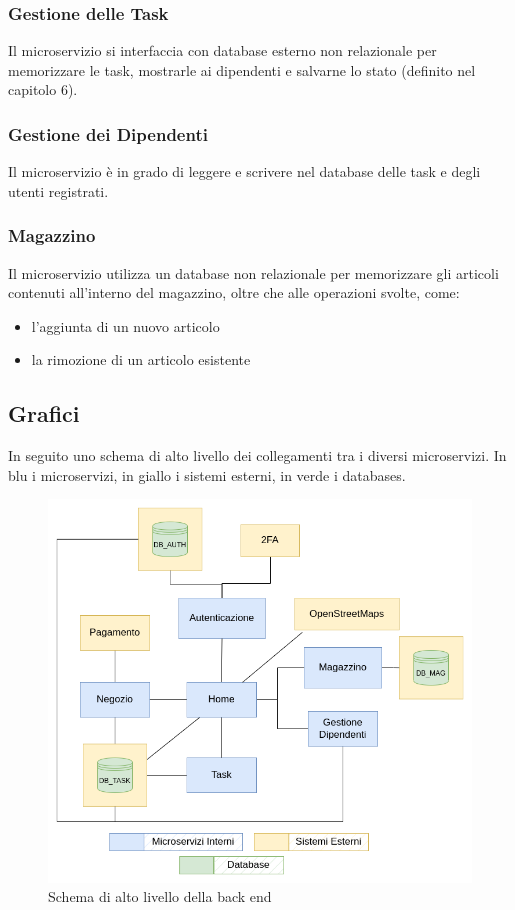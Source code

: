 \documentclass{report}
\begin{document}
\subsubsection*{Gestione delle Task}
Il microservizio si interfaccia con database esterno non relazionale per memorizzare le task, mostrarle ai dipendenti e salvarne lo stato (definito nel capitolo 6).

\subsubsection*{Gestione dei Dipendenti}
Il microservizio è in grado di leggere e scrivere nel database delle task e degli utenti registrati.

\subsubsection*{Magazzino}
Il microservizio utilizza un database non relazionale per memorizzare gli articoli contenuti all’interno del magazzino, oltre che alle operazioni svolte, come:

\begin{itemize}
	\item l’aggiunta di un nuovo articolo
	
	\item la rimozione di un articolo esistente
\end{itemize}

\subsection{Grafici}

In seguito uno schema di alto livello dei collegamenti tra i diversi microservizi. In blu i microservizi, in giallo i sistemi esterni, in verde i databases.

\begin{figure}[h]
	\centering
	\includegraphics[width=1\textwidth]{images/back_end_short}
	\caption{Schema di alto livello della back end}
\end{figure}	
\end{document}

